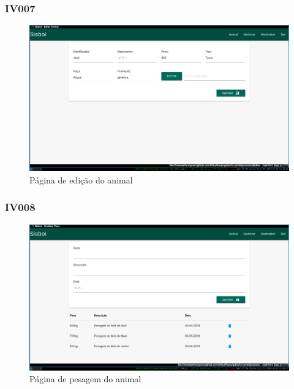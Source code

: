 \documentclass[12pt]{article}
\begin{document}
\begin{titlepage}
\begin{figure}[!h]
\begin{center}

\end{center}
\end{figure}

\newpage

\subsubsection{IV007}

\begin{figure}[!h]
\begin{center}
\caption{Página de edição do animal}
\includegraphics[width=13cm]{img/prototipos/editar.png}


\end{center}
\end{figure}


\subsubsection{IV008}

\begin{figure}[!h]
\begin{center}
\caption{Página de pesagem do animal}
\includegraphics[width=13cm]{img/prototipos/peso.png}


\end{center}
\end{figure}
\end{titlepage}
\end{document}
